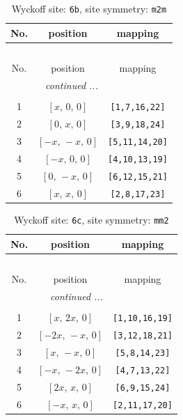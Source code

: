 \documentclass[fleqn,8pt]{jsarticle}
\begin{document}
\begin{longtable}{ccc}
\caption{Wyckoff site: {\tt 6b}, site symmetry: {\tt m2m}}
 \\
 \hline \hline
No. & position & mapping \\ \hline \endfirsthead

\multicolumn{2}{l}{\tablename\ \thetable{}} \\
 \hline \hline
No. & position & mapping \\ \hline \endhead

 \hline \hline
\multicolumn{2}{r}{\footnotesize\it continued ...} \\ \endfoot

 \hline \hline
\multicolumn{2}{r}{} \\ \endlastfoot

1 & $\left[ x,\, 0,\, 0 \right]$ & {\tt [1,7,16,22]} \\ \hline
2 & $\left[ 0,\, x,\, 0 \right]$ & {\tt [3,9,18,24]} \\ \hline
3 & $\left[ - x,\, - x,\, 0 \right]$ & {\tt [5,11,14,20]} \\ \hline
4 & $\left[ - x,\, 0,\, 0 \right]$ & {\tt [4,10,13,19]} \\ \hline
5 & $\left[ 0,\, - x,\, 0 \right]$ & {\tt [6,12,15,21]} \\ \hline
6 & $\left[ x,\, x,\, 0 \right]$ & {\tt [2,8,17,23]} \\
\end{longtable}
\renewcommand{\arraystretch}{1.2}
\begin{longtable}{ccc}
\caption{Wyckoff site: {\tt 6c}, site symmetry: {\tt mm2}}
 \\
 \hline \hline
No. & position & mapping \\ \hline \endfirsthead

\multicolumn{2}{l}{\tablename\ \thetable{}} \\
 \hline \hline
No. & position & mapping \\ \hline \endhead

 \hline \hline
\multicolumn{2}{r}{\footnotesize\it continued ...} \\ \endfoot

 \hline \hline
\multicolumn{2}{r}{} \\ \endlastfoot

1 & $\left[ x,\, 2 x,\, 0 \right]$ & {\tt [1,10,16,19]} \\ \hline
2 & $\left[ - 2 x,\, - x,\, 0 \right]$ & {\tt [3,12,18,21]} \\ \hline
3 & $\left[ x,\, - x,\, 0 \right]$ & {\tt [5,8,14,23]} \\ \hline
4 & $\left[ - x,\, - 2 x,\, 0 \right]$ & {\tt [4,7,13,22]} \\ \hline
5 & $\left[ 2 x,\, x,\, 0 \right]$ & {\tt [6,9,15,24]} \\ \hline
6 & $\left[ - x,\, x,\, 0 \right]$ & {\tt [2,11,17,20]} \\
\end{longtable}
\end{document}
